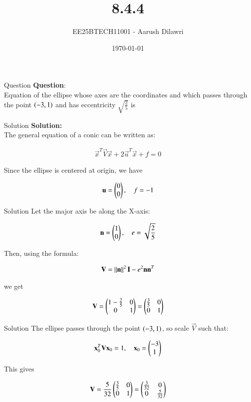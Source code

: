 \documentclass{beamer}
\title{8.4.4}
\date{\today}
\author{EE25BTECH11001 - Aarush Dilawri}
\begin{document}
\frame{\titlepage}

\begin{frame}{Question}
\textbf{Question}:\\
Equation of the ellipse whose axes are the coordinates and which passes through the point $\left(-3,1\right)$ and has eccentricity $\sqrt{\frac{2}{5}}$ is
\end{frame}
\begin{frame}{Solution}
\textbf{Solution:} \\
The general equation of a conic can be written as:

\begin{align}
\vec{x}^T \vec{V} \vec{x} + 2 \vec{u}^T \vec{x} + f = 0
\end{align}

Since the ellipse is centered at origin, we have

\begin{align}
\mathbf{u} = \begin{pmatrix}0 \\ 0\end{pmatrix}, \quad f = -1
\end{align}
\end{frame}
\begin{frame}{Solution}
Let the major axis be along the X-axis:

\begin{align}
\mathbf{n} = \begin{pmatrix}1 \\ 0\end{pmatrix}, \quad e = \sqrt{\frac{2}{5}}
\end{align}

Then, using the formula:

\begin{align}
\mathbf{V} = \left\lVert\mathbf{n}\right\rVert^2 \mathbf{I} - e^2 \mathbf{n} \mathbf{n}^T
\end{align}

we get

\begin{align}
\mathbf{V} = \begin{pmatrix}1 - \frac{2}{5} & 0 \\ 0 & 1\end{pmatrix} = \begin{pmatrix}\frac{3}{5} & 0 \\ 0 & 1\end{pmatrix}
\end{align}
\end{frame}
    
\begin{frame}{Solution}
The ellipse passes through the point $\left(-3,1\right)$, so scale $\vec{V}$ such that:

\begin{align}
\mathbf{x}_0^T \mathbf{V} \mathbf{x}_0 = 1, \quad \mathbf{x}_0 = \begin{pmatrix}-3 \\ 1\end{pmatrix}
\end{align}

This gives

\begin{align}
\mathbf{V} = \frac{5}{32} \begin{pmatrix}\frac{3}{5} & 0 \\ 0 & 1\end{pmatrix} = \begin{pmatrix}\frac{3}{32} & 0 \\ 0 & \frac{5}{32}\end{pmatrix}
\end{align}
\end{frame}
\end{document}
